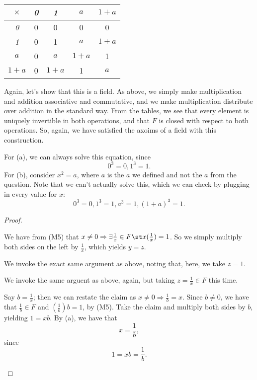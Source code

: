 \documentclass{assignment}
\begin{document}
\begin{qparts}
\begin{center}
    \begin{tabular}{c|c|c|c|c}
      $\times$ & \emph{0} & \emph{1} & \emph{$a$} & \emph{$1+a$} \\
      \hline 
      \emph{0} & 0 & 0 & 0 & 0 \\
      \emph{1} & 0 & 1 & $a$ & $1+a$ \\
      \emph{$a$} & 0 & $a$ & $1+a$ & 1 \\
      \emph{$1+a$} & 0 & $1+a$ & 1 & $a$ 
    \end{tabular}
  \end{center}
  Again, let's show that this is a field. As above, we simply make multiplication and addition associative
  and commutative, and we make multiplication distribute over addition in the standard way. From the tables,
  we see that every element is uniquely invertible in both operations, and that $F$ is closed with respect
  to both operations. So, again, we have satisfied the axoims of a field with this construction.

\item 
    For (a), we can always solve this equation, since $$0^3 = 0, 1^3 = 1.$$ 
    For (b), consider $x^2 = a$, where $a$ is the $a$ we defined and not the $a$ from the question. Note that
    we can't actually solve this, which we can check by plugging in every value for $x$: $$0^3 = 0,
    1^3 = 1, a^3 = 1, (1+a)^3 = 1.$$
\end{qparts}



\begin{proof}
  \vspace{1em}
  \begin{qparts}
  \item We have from (M5) that $x\neq 0 \Rightarrow \exists \frac{1}{x}\in F \st x(\frac{1}{x}) = 1$.
    So we simply multiply both sides on the left by $\frac{1}{x}$, which yields $y=z$.
  \item We invoke the exact same argument as above, noting that, here, we take $z=1$.
  \item We invoke the same arguent as above, again, but taking $z=\frac{1}{x}\in F$ this time.
  \item Say $b = \frac{1}{x}$; then we can restate the claim as $x\neq 0 \Rightarrow \frac{1}{b} = x$.
    Since $b\neq 0$, we have that $\frac{1}{b}\in F$ and $(\frac{1}{b})b = 1$, by (M5). Take the claim and multiply
    both sides by $b$, yielding $1 = xb$. By (a), we have that $$x = \frac{1}{b},$$ since $$1 = xb = \frac{1}{b}.$$
  \end{qparts}
\end{proof}
\end{document}
